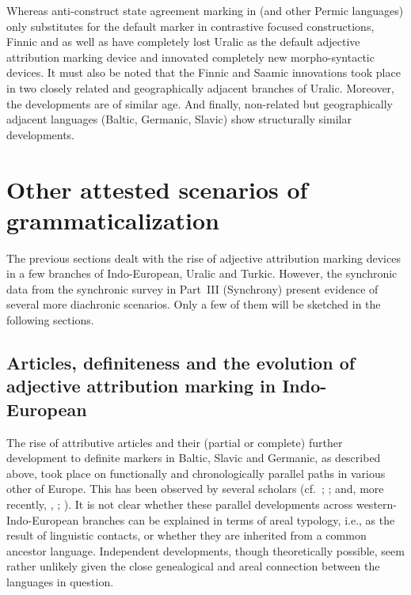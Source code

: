 {Whereas anti\hyp{}construct state agreement marking in  (and other Permic languages) only substitutes for the default marker in contrastive focused constructions, Finnic and  as well as  have completely lost Uralic  as the default adjective attribution marking device and innovated completely new morpho-syntactic devices. It must also be noted that the Finnic and Saamic innovations took place in two closely related and geographically adjacent branches of Uralic. Moreover, the developments are of similar age. And finally, non-related but geographically adjacent languages (Baltic, Germanic, Slavic) show structurally similar developments.

\section{Other attested scenarios of grammaticalization}
The previous sections dealt with the rise of adjective attribution marking devices in a few branches of Indo-European, Uralic and Turkic. However, the synchronic data from the synchronic survey in Part~III (Synchrony) present evidence of several more diachronic scenarios. Only a few of them will be sketched in the following sections.

\subsection[Articles, definiteness and adjective attribution]{Articles, definiteness and the evolution of adjective attribution marking in Indo-European}

\largerpage
The rise of attributive articles and their (partial or complete) further development to definite markers in Baltic, Slavic and Germanic, as described above, took place on functionally and chronologically parallel paths in various other  of Europe. This has been observed by several scholars (cf.~\citealt{brugmann-etal1916}; \citealt{gamillscheg1937}; \citealt{heinrichs1954} and, more recently, \citealt{nocentini1996}, \citealt{philippi1997}; \citealt{himmelmann1997}). It is not clear whether these parallel developments across western-Indo-European branches can be explained in terms of areal typology, i.e., as the result of linguistic contacts, or whether they are inherited from a common ancestor language. Independent developments, though theoretically possible, seem rather unlikely given the close genealogical and areal connection between the languages in question.

}
